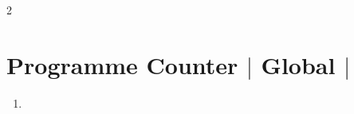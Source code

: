 \begin{paracol}{2}
\section*{Programme Counter $|$ Global $|$ \currenttime}
\begin{enumerate}    


\item \lipsum[0-1]







\end{enumerate}\switchcolumn
\vfill\end{paracol}

